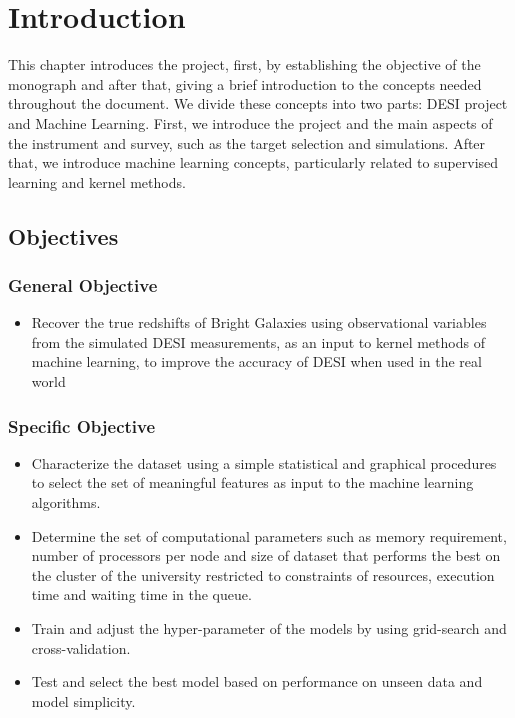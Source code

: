 \chapter{Introduction}

This chapter introduces the project, first, by establishing the objective of the monograph and after that, giving a brief introduction to the concepts needed throughout the document. We divide these concepts into two parts: DESI project and Machine Learning. First, we introduce the project and the main aspects of the instrument and survey, such as the target selection and simulations. After that, we introduce machine learning concepts, particularly related to supervised learning and kernel methods.

\section{Objectives}
\subsection{General Objective}
\begin{itemize}
	\item Recover the true redshifts of Bright Galaxies using observational variables from the simulated DESI measurements, as an input to kernel methods of machine learning, to improve the accuracy of DESI when used in the real world
\end{itemize}
\subsection{Specific Objective}
\begin{itemize}
\item Characterize the dataset using a simple statistical and graphical procedures to select the set of meaningful features as input to the machine learning algorithms. 
\item Determine the set of computational parameters such as memory requirement, number of processors per node and size of dataset that performs the best on the cluster of the university restricted to constraints of resources, execution time and waiting time in the queue.
\item Train and adjust the hyper-parameter of the models by using grid-search and cross-validation.
\item Test and select the best model based on performance on unseen data and model simplicity.
\end{itemize}
